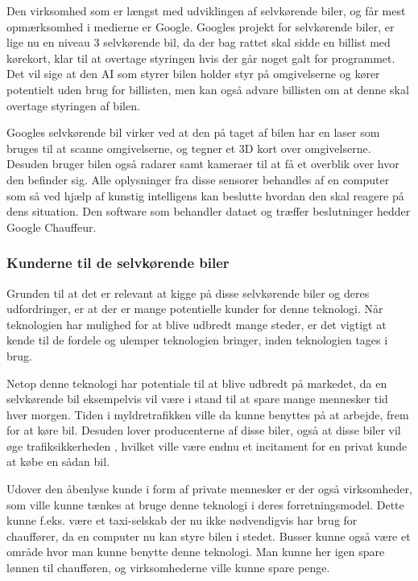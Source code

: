 Den virksomhed som er længst med udviklingen af selvkørende biler, og får mest opmærksomhed i medierne er Google. Googles projekt for selvkørende biler, er lige nu en niveau 3 selvkørende bil, da der bag rattet skal sidde en billist med kørekort, klar til at overtage styringen hvis der går noget galt for programmet. Det vil sige at den AI som styrer bilen holder styr på omgivelserne og kører potentielt uden brug for billisten, men kan også advare billisten om at denne skal overtage styringen af bilen.

Googles selvkørende bil virker ved at den på taget af bilen har en laser som bruges til at scanne omgivelserne, og tegner et 3D kort over omgivelserne. Desuden bruger bilen også radarer samt kameraer til at få et overblik over hvor den befinder sig. Alle oplysninger fra disse sensorer behandles af en computer som så ved hjælp af kunstig intelligens kan beslutte hvordan den skal reagere på dens situation. Den software som behandler dataet og træffer beslutninger hedder Google Chauffeur.

\subsubsection{Kunderne til de selvkørende biler}
Grunden til at det er relevant at kigge på disse selvkørende biler og deres udfordringer, er at der er mange potentielle kunder for denne teknologi. Når teknologien har mulighed for at blive udbredt mange steder, er det vigtigt at kende til de fordele og ulemper teknologien bringer, inden teknologien tages i brug.

Netop denne teknologi har potentiale til at blive udbredt på markedet, da en selvkørende bil eksempelvis vil være i stand til at spare mange mennesker tid hver morgen. Tiden i myldretrafikken ville da kunne benyttes på at arbejde, frem for at køre bil. Desuden lover producenterne af disse biler, også at disse biler vil øge trafiksikkerheden \cite{GOOG_SITE}, hvilket ville være endnu et incitament for en privat kunde at købe en sådan bil.

Udover den åbenlyse kunde i form af private mennesker er der også virksomheder, som ville kunne tænkes at bruge denne teknologi i deres forretningsmodel. Dette kunne f.eks. være et taxi-selskab der nu ikke nødvendigvis har brug for chauffører, da en computer nu kan styre bilen i stedet. Busser kunne også være et område hvor man kunne benytte denne teknologi. Man kunne her igen spare lønnen til chaufføren, og virksomhederne ville kunne spare penge.

